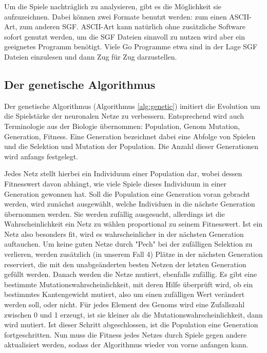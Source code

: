 Um die Spiele nachträglich zu analysieren, gibt es die Möglichkeit sie
aufzuzeichnen. Dabei können zwei Formate benutzt werden: zum einen ASCII-Art,
zum anderen SGF. ASCII-Art kann natürlich ohne zusätzliche Software sofort
genutzt werden, um die SGF Dateien sinnvoll zu nutzen wird aber ein geeignetes
Programm benötigt. Viele Go Programme etwa sind in der Lage SGF Dateien
einzulesen und dann Zug für Zug darzustellen. 

\subsection{Der genetische Algorithmus}

Der genetische Algorithmus (Algorithmus \ref{alg:genetic}) imitiert die
Evolution um die Spielstärke der neuronalen Netze zu verbessern. Entsprechend
wird auch Terminologie aus der Biologie übernommen: Population, Genom
Mutation, Generation, Fitness. Eine Generation bezeichnet dabei eine Abfolge
von Spielen und die Selektion und Mutation der Population. Die Anzahl dieser
Generationen wird anfangs festgelegt.

Jedes Netz stellt hierbei ein Individuum einer Population dar, wobei
dessen Fitnesswert davon abhängt, wie viele Spiele dieses Individuum
in einer Generation gewonnen hat. Soll die Population eine
Generation voran gebracht werden, wird zunächst ausgewählt, welche Individuen in
die nächste Generation übernommen werden. Sie werden zufällig ausgesucht,
allerdings ist die Wahrscheinlichkeit ein Netz zu wählen proportional zu seinem
Fitnesswert. Ist ein Netz also besonders fit, wird es wahrscheinlicher in der
nächsten Generation auftauchen. Um keine guten Netze durch "Pech" bei der 
zufälligen Selektion zu verlieren, werden zusätzlich (in unserem Fall 4) Plätze 
in der nächsten Generation reserviert, die mit den unabgeänderten besten Netzen 
der letzten Generation gefüllt werden. Danach werden die Netze mutiert, 
ebenfalls zufällig. Es gibt eine bestimmte Mutationswahrscheinlichkeit, mit 
deren Hilfe überprüft wird, ob ein bestimmtes Kantengewicht mutiert, also um einen
zufälligen Wert verändert werden soll, oder nicht. Für jedes Element des Genoms
wird eine Zufallszahl zwischen 0 und 1 erzeugt, ist sie kleiner als die
Mutationswahrscheinlichkeit, dann wird mutiert. Ist dieser Schritt abgeschlossen, 
ist die Population eine Generation fortgeschritten. Nun muss die Fitness jedes Netzes
durch Spiele gegen andere aktualisiert werden, sodass der Algorithmus 
wieder von vorne anfangen kann.

